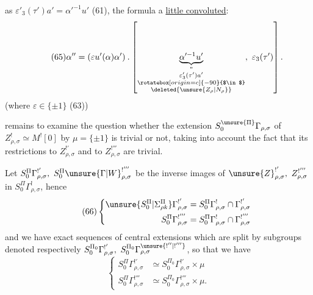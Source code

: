 
as $\varepsilon'_3(\tau')a'=\alpha'^{-1}u'$ (61), the formula a \uline{little convoluted}:
\[
\tag{65}
\alpha''=(\varepsilon u'(\alpha)\alpha')\mathbin{.}
\left[
\underbrace{\alpha'^{-1}u'}_{\substack{
\text{''}\\
\varepsilon'_3(\tau')a'\\
\rotatebox[origin=c]{-90}{$\in$}\\
\deleted{\unsure{Z_\rho|N_\rho}}
}},\ \varepsilon_3(\tau')
\right].
\]
(where $\varepsilon\in\{\pm1\}$  (63))

 remains to examine the question whether the extension
 $S_0^{\unsure{\Pi}}\Gamma_{\rho,\sigma}$ of
$Z^!_{\rho,\sigma}\simeq M^![0]$ by $\mu=\{\pm1\}$ is trivial or not,
taking into account the fact that its restrictions to $Z^{!'}_{\rho,\sigma}$ and to
$Z^{!'''}_{\rho,\sigma}$ are trivial.

Let $S_0^\Pi\Gamma^{!'}_{\rho,\sigma},\ S_0^\Pi\unsure{\Gamma|W}^{!'''}_{\rho,\sigma}$\unsure{)|]}
be the inverse images of $\unsure{Z}^{!'}_{\rho,\sigma},\ Z^{!'''}_{\rho,\sigma}$
in $S_0^\Pi\Gamma^!_{\rho,\sigma}$, hence
\[
\tag{66}
\left\{
\begin{aligned}
\unsure{S_0^\Pi|\Sigma_{\rho k}^{\Pi}}\Gamma^{!'}_{\rho,\sigma}
&=S_0^\Pi\Gamma^!_{\rho,\sigma}\cap\Gamma^{!'}_{\rho,\sigma}\\
S_0^\Pi\Gamma^{!'''}_{\rho,\sigma}
&=S_0^\Pi\Gamma^!_{\rho,\sigma}\cap\Gamma^{!'''}_{\rho,\sigma}
\end{aligned}
\right.
\]
and we have exact sequences of central extensions
which are split by subgroups denoted respectively
$S_0^{\Pi_0}\Gamma^{!'}_{\rho,\sigma},\ S_0^{\Pi_0}\Gamma^{\unsure{!''|!'''}}_{\rho,\sigma}$,
so that we have
\[
\tag{68}
\left\{
\begin{aligned}
S_0^\Pi\Gamma^{!'}_{\rho,\sigma}
&\simeq S_0^{\Pi_0}\Gamma^{!'}_{\rho,\sigma}\times\mu\\
S_0^\Pi\Gamma^{!'''}_{\rho,\sigma}
&\simeq S_0^{\Pi_0}\Gamma^{!'''}_{\rho,\sigma}\times\mu.
\end{aligned}
\right.
\]

